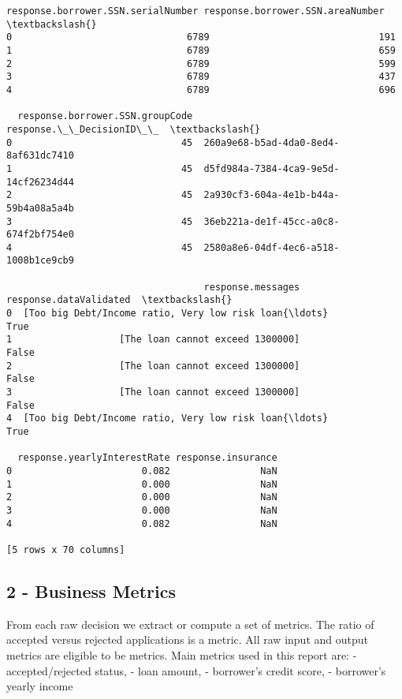 \documentclass[11pt]{article}
\begin{document}
\begin{tcolorbox}[breakable, size=fbox, boxrule=.5pt, pad at break*=1mm, opacityfill=0]
\begin{Verbatim}[commandchars=\\\{\}]
  response.borrower.SSN.serialNumber response.borrower.SSN.areaNumber  \textbackslash{}
0                               6789                              191
1                               6789                              659
2                               6789                              599
3                               6789                              437
4                               6789                              696

  response.borrower.SSN.groupCode               response.\_\_DecisionID\_\_  \textbackslash{}
0                              45  260a9e68-b5ad-4da0-8ed4-8af631dc7410
1                              45  d5fd984a-7384-4ca9-9e5d-14cf26234d44
2                              45  2a930cf3-604a-4e1b-b44a-59b4a08a5a4b
3                              45  36eb221a-de1f-45cc-a0c8-674f2bf754e0
4                              45  2580a8e6-04df-4ec6-a518-1008b1ce9cb9

                                   response.messages response.dataValidated  \textbackslash{}
0  [Too big Debt/Income ratio, Very low risk loan{\ldots}                   True
1                   [The loan cannot exceed 1300000]                  False
2                   [The loan cannot exceed 1300000]                  False
3                   [The loan cannot exceed 1300000]                  False
4  [Too big Debt/Income ratio, Very low risk loan{\ldots}                   True

  response.yearlyInterestRate response.insurance
0                       0.082                NaN
1                       0.000                NaN
2                       0.000                NaN
3                       0.000                NaN
4                       0.082                NaN

[5 rows x 70 columns]
\end{Verbatim}
\end{tcolorbox}
        
    \hypertarget{business-metrics}{%
\subsection{2 - Business Metrics}\label{business-metrics}}

From each raw decision we extract or compute a set of metrics. The ratio
of accepted versus rejected applications is a metric. All raw input and
output metrics are eligible to be metrics. Main metrics used in this
report are: - accepted/rejected status, - loan amount, - borrower's
credit score, - borrower's yearly income
\end{document}
